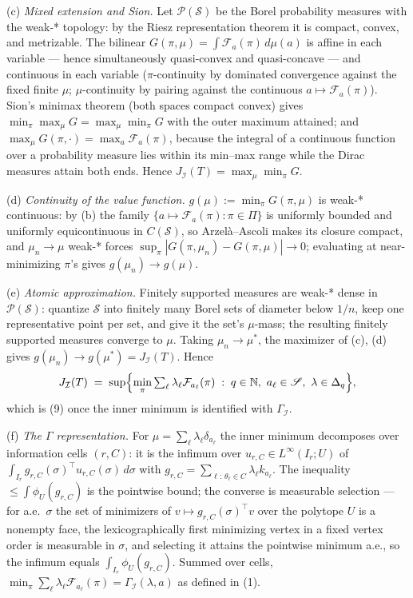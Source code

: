 \documentclass[10pt,article]{article}
\begin{document}
(c) \emph{Mixed extension and Sion.} Let
\(\mathcal P(\mathscr S)\) be the Borel probability measures with the
weak-* topology: by the Riesz representation theorem it is compact,
convex, and metrizable. The bilinear
\(G(\pi, \mu) = \int \mathcal F_a(\pi)\,d\mu(a)\) is affine in
each variable --- hence simultaneously quasi-convex and quasi-concave ---
and continuous in each variable (\(\pi\)-continuity by dominated
convergence against the fixed finite \(\mu\); \(\mu\)-continuity by
pairing against the continuous \(a \mapsto \mathcal F_a(\pi)\)).
Sion's minimax theorem (both spaces compact convex) gives
\(\min_\pi \max_\mu G = \max_\mu \min_\pi G\) with the outer
maximum attained; and \(\max_\mu G(\pi, \cdot) = \max_a
\mathcal F_a(\pi)\), because the integral of a continuous function
over a probability measure lies within its min--max range while the Dirac
measures attain both ends. Hence
\(J_{\mathcal I}(T) = \max_\mu \min_\pi G\).

(d) \emph{Continuity of the value function.} \(g(\mu) := \min_\pi
G(\pi, \mu)\) is weak-* continuous: by (b) the family
\(\{a \mapsto \mathcal F_a(\pi) : \pi \in \Pi\}\) is uniformly
bounded and uniformly equicontinuous in \(C(\mathscr S)\), so
Arzel\`a--Ascoli makes its closure compact, and \(\mu_n \to \mu\)
weak-* forces \(\sup_\pi |G(\pi, \mu_n) - G(\pi, \mu)| \to 0\);
evaluating at near-minimizing \(\pi\)'s gives \(g(\mu_n) \to
g(\mu)\).

(e) \emph{Atomic approximation.} Finitely supported measures are weak-*
dense in \(\mathcal P(\mathscr S)\): quantize \(\mathscr S\) into
finitely many Borel sets of diameter below \(1/n\), keep one
representative point per set, and give it the set's \(\mu\)-mass; the
resulting finitely supported measures converge to \(\mu\). Taking
\(\mu_n \to \mu^{*}\), the maximizer of (c), (d) gives
\(g(\mu_n) \to g(\mu^{*}) = J_{\mathcal I}(T)\). Hence
\[
J_{\mathcal I}(T) \;=\; \sup\Bigl\{ \min_\pi
\textstyle\sum_\ell \lambda_\ell \mathcal F_{a_\ell}(\pi)
\;:\; q \in \mathbb N,\ a_\ell \in \mathscr S,\
\lambda \in \Delta_q \Bigr\},
\]
which is (9) once the inner minimum is identified with
\(\Gamma_{\mathcal I}\).

(f) \emph{The \(\Gamma\) representation.} For
\(\mu = \sum_\ell \lambda_\ell \delta_{a_\ell}\) the inner minimum
decomposes over information cells \((r, C)\): it is the infimum over
\(u_{r,C} \in L^\infty(I_r; U)\) of
\(\int_{I_r} g_{r,C}(\sigma)^\top u_{r,C}(\sigma)\,d\sigma\) with
\(g_{r,C} = \sum_{\ell:\,\theta_\ell \in C} \lambda_\ell
k_{a_\ell}\). The inequality \(\le \int \phi_U(g_{r,C})\) is the
pointwise bound; the converse is measurable selection --- for a.e.\
\(\sigma\) the set of minimizers of \(v \mapsto g_{r,C}(\sigma)^\top
v\) over the polytope \(U\) is a nonempty face, the lexicographically
first minimizing vertex in a fixed vertex order is measurable in
\(\sigma\), and selecting it attains the pointwise minimum a.e.,
so the infimum equals \(\int_{I_r} \phi_U(g_{r,C})\). Summed over
cells, \(\min_\pi \sum_\ell \lambda_\ell
\mathcal F_{a_\ell}(\pi) = \Gamma_{\mathcal I}(\lambda, a)\) as
defined in (1).
\end{document}
